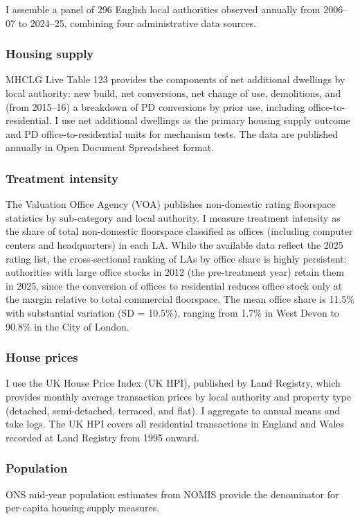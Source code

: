 \documentclass[12pt]{article}
\begin{document}
I assemble a panel of 296 English local authorities observed annually from 2006--07 to 2024--25, combining four administrative data sources.

\subsubsection*{Housing supply} MHCLG Live Table 123 provides the components of net additional dwellings by local authority: new build, net conversions, net change of use, demolitions, and (from 2015--16) a breakdown of PD conversions by prior use, including office-to-residential. I use net additional dwellings as the primary housing supply outcome and PD office-to-residential units for mechanism tests. The data are published annually in Open Document Spreadsheet format.

\subsubsection*{Treatment intensity} The Valuation Office Agency (VOA) publishes non-domestic rating floorspace statistics by sub-category and local authority. I measure treatment intensity as the share of total non-domestic floorspace classified as offices (including computer centers and headquarters) in each LA. While the available data reflect the 2025 rating list, the cross-sectional ranking of LAs by office share is highly persistent: authorities with large office stocks in 2012 (the pre-treatment year) retain them in 2025, since the conversion of offices to residential reduces office stock only at the margin relative to total commercial floorspace. The mean office share is 11.5\% with substantial variation (SD = 10.5\%), ranging from 1.7\% in West Devon to 90.8\% in the City of London.

\subsubsection*{House prices} I use the UK House Price Index (UK HPI), published by Land Registry, which provides monthly average transaction prices by local authority and property type (detached, semi-detached, terraced, and flat). I aggregate to annual means and take logs. The UK HPI covers all residential transactions in England and Wales recorded at Land Registry from 1995 onward.

\subsubsection*{Population} ONS mid-year population estimates from NOMIS provide the denominator for per-capita housing supply measures.
\end{document}
